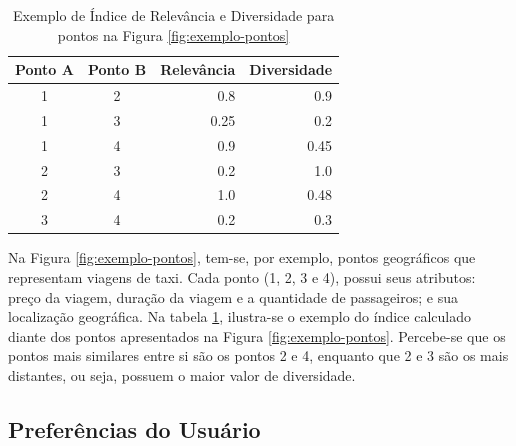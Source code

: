 \begin{table}[!h]
	\centering
	\begin{tabular}{|c|c|r|r|}
	\hline
	\multicolumn{1}{|c|}{\textbf{Ponto A}} & \multicolumn{1}{c|}{\textbf{Ponto B}} & \multicolumn{1}{c|}{\textbf{Relevância}} & \multicolumn{1}{c|}{\textbf{Diversidade}} \\ \hline
	1                                      & 2                                     & 0.8                                      & 0.9                                       \\ \hline
	1                                      & 3                                     & 0.25                                     & 0.2                                       \\ \hline
	1                                      & 4                                     & 0.9                                      & 0.45                                      \\ \hline
	2                                      & 3                                     & 0.2                                      & 1.0                                       \\ \hline
	2                                      & 4                                     & 1.0                                      & 0.48                                      \\ \hline
	3                                      & 4                                     & 0.2                                      & 0.3                                       \\ \hline
	\end{tabular}
	\caption{Exemplo de Índice de Relevância e Diversidade para pontos na Figura \ref{fig:exemplo-pontos}}
	\label{table:exemplo-indice}
\end{table}

Na Figura \ref{fig:exemplo-pontos}, tem-se, por exemplo, pontos geográficos que representam viagens de taxi. Cada ponto (1, 2, 3 e 4), possui seus atributos: preço da viagem, duração da viagem e a quantidade de passageiros; e sua localização geográfica. Na tabela \ref{table:exemplo-indice}, ilustra-se o exemplo do índice calculado diante dos pontos apresentados na Figura \ref{fig:exemplo-pontos}. Percebe-se que os pontos mais similares entre si são os pontos 2 e 4, enquanto que 2 e 3 são os mais distantes, ou seja, possuem o maior valor de diversidade.


\subsection{Preferências do Usuário}

